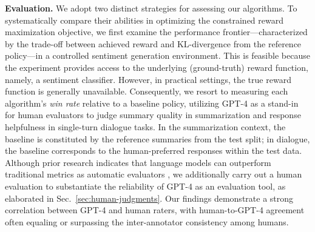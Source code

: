 \textbf{Evaluation.} We adopt two distinct strategies for assessing our algorithms. To systematically compare their abilities in optimizing the constrained reward maximization objective, we first examine the performance frontier—characterized by the trade-off between achieved reward and KL-divergence from the reference policy—in a controlled sentiment generation environment. This is feasible because the experiment provides access to the underlying (ground-truth) reward function, namely, a sentiment classifier. However, in practical settings, the true reward function is generally unavailable. Consequently, we resort to measuring each algorithm’s \textit{win rate} relative to a baseline policy, utilizing GPT-4 as a stand-in for human evaluators to judge summary quality in summarization and response helpfulness in single-turn dialogue tasks. In the summarization context, the baseline is constituted by the reference summaries from the test split; in dialogue, the baseline corresponds to the human-preferred responses within the test data. Although prior research indicates that language models can outperform traditional metrics as automatic evaluators \citep{Chen2023ExploringTU}, we additionally carry out a human evaluation to substantiate the reliability of GPT-4 as an evaluation tool, as elaborated in Sec.~\ref{sec:human-judgments}. Our findings demonstrate a strong correlation between GPT-4 and human raters, with human-to-GPT-4 agreement often equaling or surpassing the inter-annotator consistency among humans.

